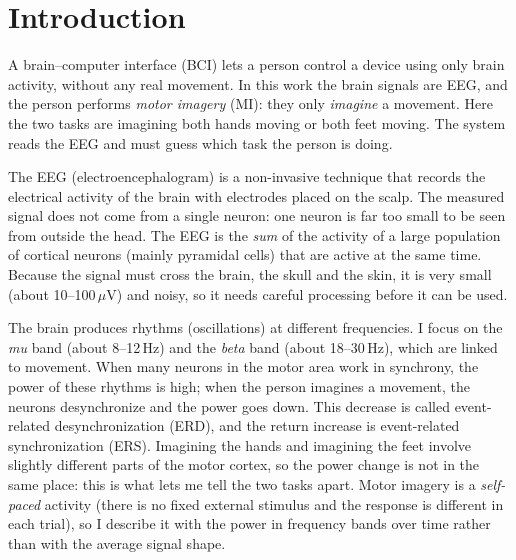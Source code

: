 \documentclass[10pt,twocolumn,a4paper]{article}
\begin{document}

\section{Introduction}
\label{sec:intro}

A brain--computer interface (BCI) lets a person control a device using only
brain activity, without any real movement. In this work the brain signals are
EEG, and the person performs \emph{motor imagery} (MI): they only
\emph{imagine} a movement. Here the two tasks are imagining both hands moving or
both feet moving. The system reads the EEG and must guess which task the person
is doing.

The EEG (electroencephalogram) is a non-invasive technique that records the
electrical activity of the brain with electrodes placed on the scalp. The
measured signal does not come from a single neuron: one neuron is far too small
to be seen from outside the head. The EEG is the \emph{sum} of the activity of a
large population of cortical neurons (mainly pyramidal cells) that are active at
the same time. Because the signal must cross the brain, the skull and the skin,
it is very small (about 10--100\,$\mu$V) and noisy, so it needs careful
processing before it can be used.

The brain produces rhythms (oscillations) at different frequencies. I focus on
the \emph{mu} band (about 8--12\,Hz) and the \emph{beta} band (about
18--30\,Hz), which are linked to movement. When many neurons in the motor area
work in synchrony, the power of these rhythms is high; when the person imagines
a movement, the neurons desynchronize and the power goes down. This decrease is
called event-related desynchronization (ERD), and the return increase is
event-related synchronization (ERS). Imagining the hands and imagining the feet
involve slightly different parts of the motor cortex, so the power change is not
in the same place: this is what lets me tell the two tasks apart. Motor imagery
is a \emph{self-paced} activity (there is no fixed external stimulus and the
response is different in each trial), so I describe it with the power in
frequency bands over time rather than with the average signal shape.
\end{document}
